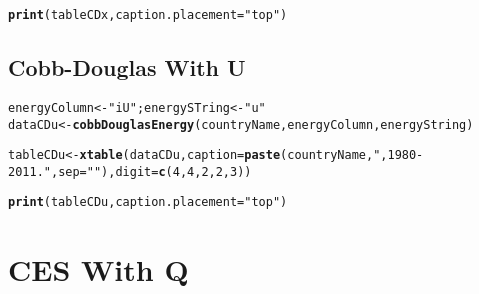 \documentclass[preprint,authoryear,12pt]{elsarticle}\usepackage{graphicx, color}
\makeatletter
\newcommand{\hlfunctioncall}[1]{\textcolor[rgb]{0.501960784313725,0,0.329411764705882}{\textbf{#1}}}%
\newcommand{\hlstring}[1]{\textcolor[rgb]{0.6,0.6,1}{#1}}%
\newenvironment{kframe}{%
 \def\at@end@of@kframe{}%
 \ifinner\ifhmode%
  \def\at@end@of@kframe{\end{minipage}}%
  \begin{minipage}{\columnwidth}%
 \fi\fi%
 \def\FrameCommand##1{\hskip\@totalleftmargin \hskip-\fboxsep
 \colorbox{shadecolor}{##1}\hskip-\fboxsep
     \hskip-\linewidth \hskip-\@totalleftmargin \hskip\columnwidth}%
 \MakeFramed {\advance\hsize-\width
   \@totalleftmargin\z@ \linewidth\hsize
   \@setminipage}}%
 {\par\unskip\endMakeFramed%
 \at@end@of@kframe}
\newenvironment{knitrout}{}{} %
\makeatother
\begin{document}
\begin{kframe}
\begin{alltt}
\hlfunctioncall{print}(tableCDx, caption.placement=\hlstring{"top"})
\end{alltt}


{\ttfamily\noindent\bfseries\color{errorcolor}{Error: error in evaluating the argument 'x' in selecting a method for function 'print': Error: object 'tableCDx' not found}}\end{kframe}


\subsection{Cobb-Douglas With U}

\begin{knitrout}
\color{fgcolor}\begin{kframe}
\begin{alltt}
energyColumn <- \hlstring{"iU"}; energySTring <- \hlstring{"u"}
dataCDu <- \hlfunctioncall{cobbDouglasEnergy}(countryName, energyColumn, energyString)
\end{alltt}


{\ttfamily\noindent\bfseries\color{errorcolor}{Error: could not find function "cobbDouglasEnergy"}}\begin{alltt}
tableCDu <- \hlfunctioncall{xtable}(dataCDu, caption=\hlfunctioncall{paste}(countryName, \hlstring{", 1980-2011."}, sep=\hlstring{""}), digit = \hlfunctioncall{c}(4, 4, 2, 2, 3))
\end{alltt}


{\ttfamily\noindent\bfseries\color{errorcolor}{Error: could not find function "xtable"}}\end{kframe}
\end{knitrout}


\begin{kframe}
\begin{alltt}
\hlfunctioncall{print}(tableCDu, caption.placement=\hlstring{"top"})
\end{alltt}


{\ttfamily\noindent\bfseries\color{errorcolor}{Error: error in evaluating the argument 'x' in selecting a method for function 'print': Error: object 'tableCDu' not found}}\end{kframe}


\section{CES With Q}
\end{document}
